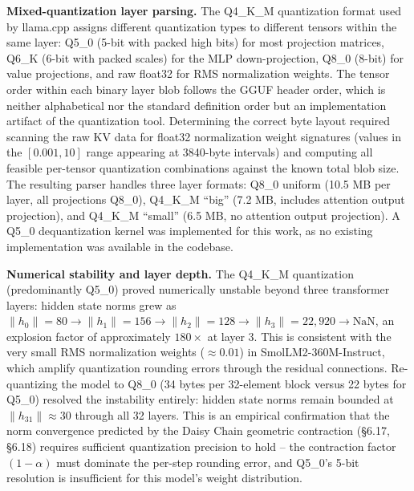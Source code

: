 \documentclass[
  11pt,
]{article}
\begin{document}
\textbf{Mixed-quantization layer parsing.} The Q4\_K\_M quantization
format used by llama.cpp assigns different quantization types to
different tensors within the same layer: Q5\_0 (5-bit with packed high
bits) for most projection matrices, Q6\_K (6-bit with packed scales) for
the MLP down-projection, Q8\_0 (8-bit) for value projections, and raw
float32 for RMS normalization weights. The tensor order within each
binary layer blob follows the GGUF header order, which is neither
alphabetical nor the standard definition order but an implementation
artifact of the quantization tool. Determining the correct byte layout
required scanning the raw KV data for float32 normalization weight
signatures (values in the \([0.001, 10]\) range appearing at 3840-byte
intervals) and computing all feasible per-tensor quantization
combinations against the known total blob size. The resulting parser
handles three layer formats: Q8\_0 uniform (10.5 MB per layer, all
projections Q8\_0), Q4\_K\_M ``big'' (7.2 MB, includes attention output
projection), and Q4\_K\_M ``small'' (6.5 MB, no attention output
projection). A Q5\_0 dequantization kernel was implemented for this
work, as no existing implementation was available in the codebase.

\textbf{Numerical stability and layer depth.} The Q4\_K\_M quantization
(predominantly Q5\_0) proved numerically unstable beyond three
transformer layers: hidden state norms grew as
\(\|h_0\| = 80 \to \|h_1\| = 156 \to \|h_2\| = 128 \to \|h_3\| = 22{,}920 \to \text{NaN}\),
an explosion factor of approximately \(180\times\) at layer 3. This is
consistent with the very small RMS normalization weights
(\(\approx 0.01\)) in SmolLM2-360M-Instruct, which amplify quantization
rounding errors through the residual connections. Re-quantizing the
model to Q8\_0 (34 bytes per 32-element block versus 22 bytes for Q5\_0)
resolved the instability entirely: hidden state norms remain bounded at
\(\|h_{31}\| \approx 30\) through all 32 layers. This is an empirical
confirmation that the norm convergence predicted by the Daisy Chain
geometric contraction (§6.17, §6.18) requires sufficient quantization
precision to hold -- the contraction factor \((1 - \alpha)\) must
dominate the per-step rounding error, and Q5\_0's 5-bit resolution is
insufficient for this model's weight distribution.
\end{document}
